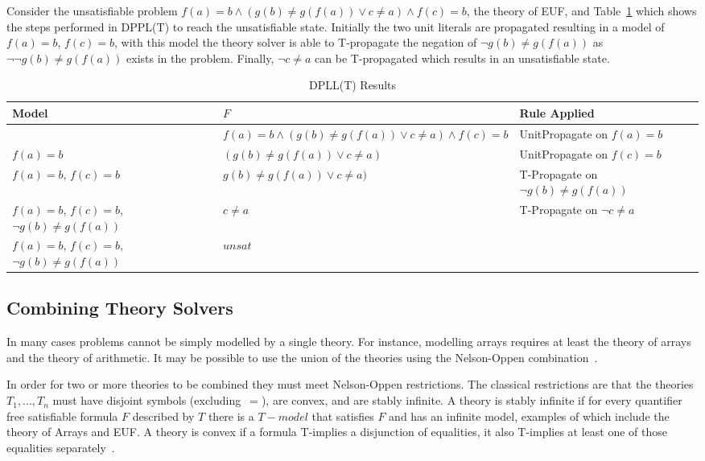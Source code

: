 \documentclass[]{final_report}
\begin{document}
Consider the unsatisfiable problem $f(a) = b \land (g(b) \neq g(f(a)) \lor c \neq a) \land f(c) = b$,  the theory of EUF, and Table~\ref{table:dpll-t-results} which shows the steps performed in DPPL(T) to reach the unsatisfiable state. Initially the two unit literals are propagated resulting in a model of $f(a) = b$, $f(c) = b$, with this model the theory solver is able to T-propagate the negation of $\lnot{g(b) \neq g(f(a))}$ as $\lnot{\lnot{g(b) \neq g(f(a))}}$ exists in the problem. Finally, $\lnot{c \neq a}$ can be T-propagated which results in an unsatisfiable state.


\begin{table}[t]
\centering
\begin{tabular}{|l|p{6.5cm}|p{3cm}|}
\hline
Model & $F$ & Rule Applied \\ \hline
{} & $f(a) = b \land (g(b) \neq g(f(a)) \lor c \neq a) \land f(c) = b$ & UnitPropagate on $f(a) = b$   \\ \hline
{$f(a) = b$ } & $(g(b) \neq g(f(a)) \lor c \neq a)$ & UnitPropagate on $ f(c) = b$   \\ \hline
{$f(a) = b$, $f(c) = b$ } & $g(b) \neq g(f(a)) \lor c \neq a)$ & T-Propagate on $\lnot{g(b) \neq g(f(a))}$   \\ \hline
{$f(a) = b$, $f(c) = b$, $\lnot{g(b) \neq g(f(a))}$ } & $c \neq a$ & T-Propagate on $\lnot{c \neq a}$   \\ \hline
{$f(a) = b$, $f(c) = b$, $\lnot{g(b) \neq g(f(a))}$ } & $unsat$ &    \\ \hline
\end{tabular}
\caption{DPLL(T) Results}
\label{table:dpll-t-results}
\end{table}

\subsection{Combining Theory Solvers}
In many cases problems cannot be simply modelled by a single theory. For instance, modelling arrays requires at least the theory of arrays and the theory of arithmetic. It may be possible to use the union of the theories using the Nelson-Oppen combination~\cite{smtdpplt}. 

In order for two or more theories to be combined they must meet Nelson-Oppen restrictions. The classical restrictions are that the theories $T_1, ..., T_n$ must have disjoint symbols (excluding~$=$), are convex, and are stably infinite. A theory is stably infinite if for every quantifier free satisfiable formula $F$ described by $T$ there is a $T-model$ that satisfies $F$ and has an infinite model, examples of which include the theory of Arrays and EUF. A theory is convex if a formula T-implies a disjunction of equalities, it also T-implies at least one of those equalities separately~\cite{Torlak}.
\end{document}
